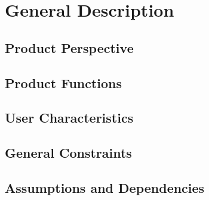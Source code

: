 
\section{General Description}

	\subsection{Product Perspective}
	\subsection{Product Functions}
	\subsection{User Characteristics}
	\subsection{General Constraints}
	\subsection{Assumptions and Dependencies}